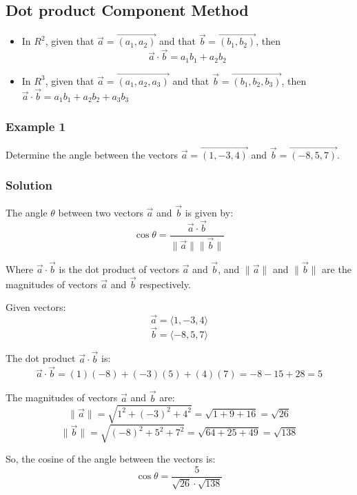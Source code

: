 \documentclass{article}
\begin{document}
\subsection{Dot product Component Method}
\begin{tcolorbox}[enhanced,frame style image=blueshade.png,
  opacityback=0.75,opacitybacktitle=0.25,
  colback=blue!5!white,colframe=blue!75!black] 
  \begin{itemize}
      \item In $R^2$, given that $\vec{a}=\overrightarrow{\left(a_1, a_2\right)}$ and that $\vec{b}=\overrightarrow{\left(b_1, b_2\right)}$, then
$$
\vec{a} \cdot \vec{b}=a_1 b_1+a_2 b_2
$$
\item In $R^3$, given that $\vec{a}=\overrightarrow{\left(a_1, a_2, a_3\right)}$ and that $\vec{b}=\overrightarrow{\left(b_1, b_2, b_3\right)}$, then $\vec{a} \cdot \vec{b}=a_1 b_1+a_2 b_2+a_3 b_3$
\end{itemize}
\end{tcolorbox}

\subsubsection*{Example 1}
Determine the angle between the vectors $\vec{a}=\overrightarrow{(1,-3,4)}$ and $\vec{b}=\overrightarrow{(-8,5,7)}$.

\subsubsection*{Solution}
The angle $\theta$ between two vectors $\vec{a}$ and $\vec{b}$ is given by:
\[ \cos \theta = \frac{\vec{a} \cdot \vec{b}}{\|\vec{a}\| \|\vec{b}\|} \]

Where $\vec{a} \cdot \vec{b}$ is the dot product of vectors $\vec{a}$ and $\vec{b}$, and $\|\vec{a}\|$ and $\|\vec{b}\|$ are the magnitudes of vectors $\vec{a}$ and $\vec{b}$ respectively.

Given vectors:
\[ \vec{a} = \langle 1, -3, 4 \rangle \]
\[ \vec{b} = \langle -8, 5, 7 \rangle \]

The dot product $\vec{a} \cdot \vec{b}$ is:
\[ \vec{a} \cdot \vec{b} = (1)(-8) + (-3)(5) + (4)(7) = -8 - 15 + 28 = 5 \]

The magnitudes of vectors $\vec{a}$ and $\vec{b}$ are:
\[ \|\vec{a}\| = \sqrt{1^2 + (-3)^2 + 4^2} = \sqrt{1 + 9 + 16} = \sqrt{26} \]
\[ \|\vec{b}\| = \sqrt{(-8)^2 + 5^2 + 7^2} = \sqrt{64 + 25 + 49} = \sqrt{138} \]

So, the cosine of the angle between the vectors is:
\[ \cos \theta = \frac{5}{\sqrt{26} \cdot \sqrt{138}} \]
\end{document}
